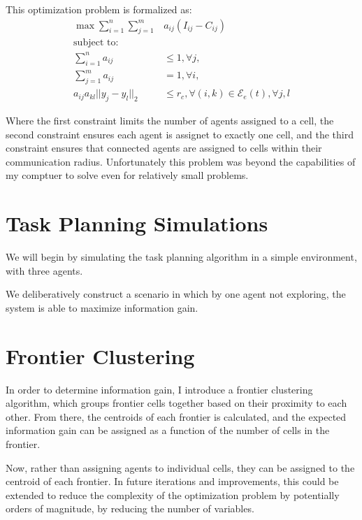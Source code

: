 \documentclass[conference]{IEEEtran}
\begin{document}
This optimization problem is formalized as:
\begin{equation}
    \begin{aligned}
        \max \sum_{i=1}^{n} \sum_{j=1}^{m} &a_{ij}(I_{ij} - C_{ij}) \\
        \text{subject to:}&\\
        \sum_{i=1}^{n} a_{ij} &\leq 1, \forall j,\\
        \sum_{j=1}^{m} a_{ij} &= 1, \forall i,\\
        a_{ij}a_{kl} ||y_j - y_l||_2 &\leq r_c, \forall (i, k) \in \mathcal E_e(t), \forall j, l
    \end{aligned}
\end{equation}

Where the first constraint limits the number of agents assigned to a cell,
the second constraint ensures each agent is assignet to exactly one cell,
and the third constraint ensures that connected agents are assigned to cells within their communication radius.
Unfortunately this problem was beyond the capabilities of my comptuer to solve even for
relatively small problems.


\section{Task Planning Simulations}

We will begin by simulating the task planning algorithm in a simple environment, with three agents. 

We deliberatively construct a scenario in which by one agent not exploring, the system is able to maximize information gain.



\section{Frontier Clustering}
In order to determine information gain, I introduce a frontier clustering algorithm, which groups frontier cells together based on their proximity to each other.
From there, the centroids of each frontier is calculated, and the expected information gain can be assigned as a function of the number of cells in the frontier.

Now, rather than assigning agents to individual cells, they can be assigned to the centroid of each frontier. In future iterations and improvements,
this could be extended to reduce the complexity of the optimization problem by potentially orders of magnitude, by reducing the number of variables.
\end{document}
